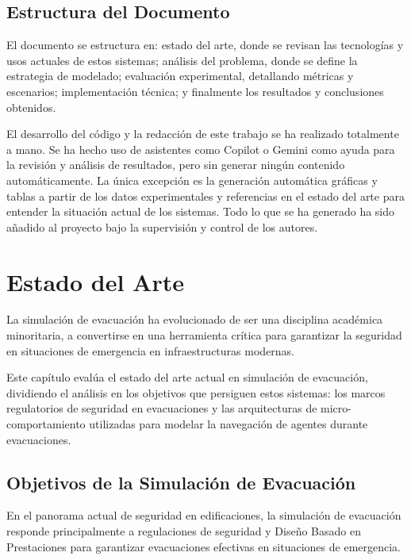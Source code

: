 \documentclass[11pt,spanish,listoffigures,listoftables]{tfgetsinf}
\begin{document}
\section{Estructura del Documento}
El documento se estructura en: estado del arte, donde se revisan las tecnologías y usos actuales de estos sistemas; análisis del problema, donde se define la estrategia de modelado; evaluación experimental, detallando métricas y escenarios; implementación técnica; y finalmente los resultados y conclusiones obtenidos.


El desarrollo del código y la redacción de este trabajo se ha realizado totalmente a mano. Se ha hecho uso de asistentes como Copilot o Gemini como ayuda para la revisión y análisis de resultados, pero sin generar ningún contenido automáticamente. La única excepción es la generación automática gráficas y tablas a partir de los datos experimentales y referencias en el estado del arte para entender la situación actual de los sistemas. Todo lo que se ha generado ha sido añadido al proyecto bajo la supervisión y control de los autores.

\chapter{Estado del Arte}

La simulación de evacuación ha evolucionado de ser una disciplina académica minoritaria, a convertirse en una herramienta crítica para garantizar la seguridad en situaciones de emergencia en infraestructuras modernas. 

Este capítulo evalúa el estado del arte actual en simulación de evacuación, dividiendo el análisis en los objetivos que persiguen estos sistemas: los marcos regulatorios de seguridad en evacuaciones y las arquitecturas de micro-comportamiento utilizadas para modelar la navegación de agentes durante evacuaciones. 

\section{Objetivos de la Simulación de Evacuación}

En el panorama actual de seguridad en edificaciones, la simulación de evacuación responde principalmente a regulaciones de seguridad y Diseño Basado en Prestaciones para garantizar evacuaciones efectivas en situaciones de emergencia.
\end{document}

